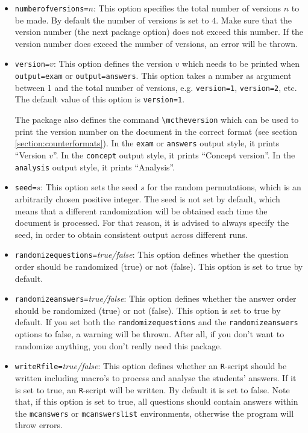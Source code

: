 \documentclass{article}
\begin{document}
\begin{itemize}
  
 \item \verb$numberofversions=$$n$: 
       This option specifies the total number of versions $n$ to be made. By default the number of versions is set to $4$. Make sure that the version number (the next package option) does not exceed this number. If the version number does exceed the number of versions, an error will be thrown.

 \item \verb$version=$$v$: 
       This option defines the version $v$ which needs to be printed when \verb$output=exam$ or \verb$output=answers$. This option takes a number as argument between 1 and the total number of versions, e.g. \verb$version=1$, \verb$version=2$, etc. The default value of this option is \verb$version=1$. 
              
       The package also defines the command \verb+\mctheversion+ which can be used to print the version number on the document in the correct format (see section \ref{section:counterformats}). In the \verb$exam$ or \verb$answers$ output style, it prints ``Version $v$''. In the \verb$concept$ output style, it prints ``Concept version''. In the \verb$analysis$ output style, it prints ``Analysis''. 

 \item \verb$seed=$$s$: 
       This option sets the seed $s$ for the random permutations, which is an arbitrarily chosen positive integer. The seed is not set by default, which means that a different randomization will be obtained each time the document is processed. For that reason, it is advised to always specify the seed, in order to obtain consistent output across different runs.

 \item \verb$randomizequestions=$\emph{true/false}:
       This option defines whether the question order should be randomized (true) or not (false). This option is set to true by default. 

 \item \verb$randomizeanswers=$\emph{true/false}: 
       This option defines whether the answer order should be randomized (true) or not (false). This option is set to true by default. If you set both the \verb$randomizequestions$ and the \verb$randomizeanswers$ options to false, a warning will be thrown. After all, if you don't want to randomize anything, you don't really need this package. 

 \item \verb$writeRfile=$\emph{true/false}: 
       This option defines whether an \verb$R$-script should be written including macro's to process and analyse the students' answers. If it is set to true, an \verb$R$-script will be written. By default it is set to false. Note that, if this option is set to true, all questions should contain answers within the \verb+mcanswers+ or \verb+mcanswerslist+ environments, otherwise the program will throw errors.

\end{itemize}
\end{document}
